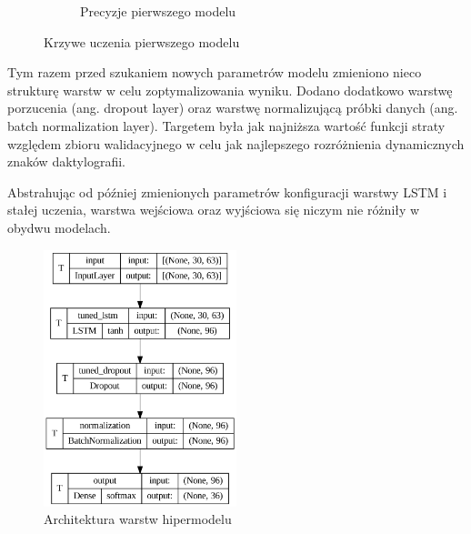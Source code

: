 \begin{figure}[H]
\begin{subfigure}[H]{0.49\textwidth}
        \caption{Precyzje pierwszego modelu}
        \label{fig:initial-accuracy}
    \end{subfigure}
    \caption{Krzywe uczenia pierwszego modelu}
    \label{fig:initial-loss-accuracy}
\end{figure}

Tym razem przed szukaniem nowych parametrów modelu zmieniono nieco strukturę warstw w celu zoptymalizowania wyniku. Dodano dodatkowo warstwę porzucenia (ang. dropout layer) oraz warstwę normalizującą próbki danych (ang. batch normalization layer). Targetem była jak najniższa wartość funkcji straty względem zbioru walidacyjnego w celu jak najlepszego rozróżnienia dynamicznych znaków daktylografii.

Abstrahując od później zmienionych parametrów konfiguracji warstwy LSTM i stałej uczenia, warstwa wejściowa oraz wyjściowa się niczym nie różniły w obydwu modelach.

\begin{figure}[H]
    \centering
    \includegraphics[width=0.5\textwidth]{figures/hypermodel-layers}
    \caption{Architektura warstw hipermodelu}
    \label{fig:hypermodel-layers}
\end{figure}


